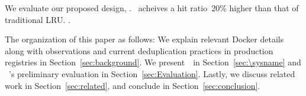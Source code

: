 
We evaluate our proposed design, \sysname. 
\sysname~acheives a hit ratio~20\% higher than that of traditional LRU. 
.  




The organization of this paper as follows: 
We explain relevant Docker details along with observations and current deduplication practices in production registries in Section~\ref{sec:background}.
We present~\sysname~in Section~\ref{sec:\sysname} and ~\sysname's preliminary evaluation in Section~\ref{sec:Evaluation}. 
Lastly, we discuss related work in Section~\ref{sec:related},
and conclude in Section~\ref{sec:conclusion}.


